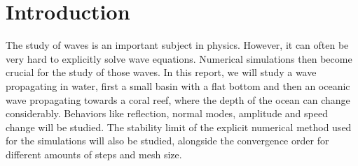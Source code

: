 \section{Introduction}

The study of waves is an important subject in physics. However, it can often be very hard to explicitly solve wave equations. Numerical simulations then become crucial for the study of those waves. In this report, we will study a wave propagating in water, first a small basin with a flat bottom and then an oceanic wave propagating towards a coral reef, where the depth of the ocean can change considerably. Behaviors like reflection, normal modes, amplitude and speed change will be studied. The stability limit of the explicit numerical method used for the simulations will also be studied, alongside the convergence order for different amounts of steps and mesh size.
